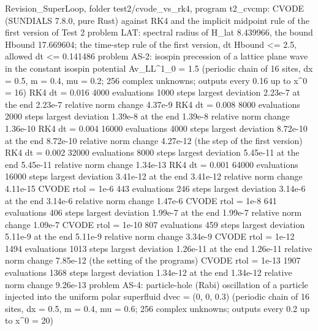 \documentclass[
  10pt,
]{article}
\newenvironment{Shaded}{}{}
\newcommand{\NormalTok}[1]{#1}
\begin{document}
\begin{Shaded}
\begin{Highlighting}[]
\NormalTok{Revision\_SuperLoop, folder test2/cvode\_vs\_rk4, program \textasciigrave{}t2\_cvcmp\textasciigrave{}: CVODE (SUNDIALS 7.8.0, pure Rust) against RK4 and the implicit midpoint rule of the first version of Test 2}
\NormalTok{problem LAT: spectral radius of H\_lat 8.439966, the bound Hbound 17.669604; the time{-}step rule of the first version, dt Hbound \textless{}= 2.5, allowed dt \textless{}= 0.141486}
\NormalTok{problem AS{-}2: isospin precession of a lattice plane wave in the constant isospin potential Av\_LL\^{}1\_0 = 1.5 (periodic chain of 16 sites, dx = 0.5, m = 0.4, mu = 0.2; 256 complex unknowns; outputs every 0.16 up to x\^{}0 = 16)}
\NormalTok{  RK4   dt = 0.016        4000 evaluations    1000 steps  largest deviation 2.23e{-}7  at the end 2.23e{-}7  relative norm change 4.37e{-}9}
\NormalTok{  RK4   dt = 0.008        8000 evaluations    2000 steps  largest deviation 1.39e{-}8  at the end 1.39e{-}8  relative norm change 1.36e{-}10}
\NormalTok{  RK4   dt = 0.004       16000 evaluations    4000 steps  largest deviation 8.72e{-}10  at the end 8.72e{-}10  relative norm change 4.27e{-}12  (the step of the first version)}
\NormalTok{  RK4   dt = 0.002       32000 evaluations    8000 steps  largest deviation 5.45e{-}11  at the end 5.45e{-}11  relative norm change 1.34e{-}13}
\NormalTok{  RK4   dt = 0.001       64000 evaluations   16000 steps  largest deviation 3.41e{-}12  at the end 3.41e{-}12  relative norm change 4.11e{-}15}
\NormalTok{  CVODE rtol = 1e{-}6        443 evaluations     246 steps  largest deviation 3.14e{-}6  at the end 3.14e{-}6  relative norm change 1.47e{-}6}
\NormalTok{  CVODE rtol = 1e{-}8        641 evaluations     406 steps  largest deviation 1.99e{-}7  at the end 1.99e{-}7  relative norm change 1.09e{-}7}
\NormalTok{  CVODE rtol = 1e{-}10       807 evaluations     459 steps  largest deviation 5.11e{-}9  at the end 5.11e{-}9  relative norm change 3.34e{-}9}
\NormalTok{  CVODE rtol = 1e{-}12      1494 evaluations    1013 steps  largest deviation 1.26e{-}11  at the end 1.26e{-}11  relative norm change 7.85e{-}12  (the setting of the programs)}
\NormalTok{  CVODE rtol = 1e{-}13      1907 evaluations    1368 steps  largest deviation 1.34e{-}12  at the end 1.34e{-}12  relative norm change 9.26e{-}13}
\NormalTok{problem AS{-}4: particle{-}hole (Rabi) oscillation of a particle injected into the uniform polar superfluid dvec = (0, 0, 0.3) (periodic chain of 16 sites, dx = 0.5, m = 0.4, mu = 0.6; 256 complex unknowns; outputs every 0.2 up to x\^{}0 = 20)}

\end{Highlighting}
\end{Shaded}
\end{document}
